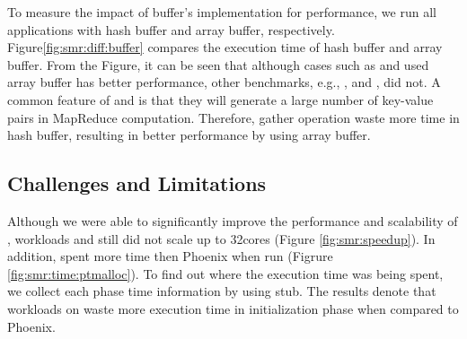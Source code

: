 
To measure the impact of buffer's implementation for performance, we run all applications with hash buffer and array buffer, respectively.
Figure\ref{fig:smr:diff:buffer} compares the execution time of hash buffer and array buffer. 
From the Figure, it can be seen that although cases such as  and  used array buffer has better performance, other benchmarks, e.g., ,  and , did not.
A common feature of  and  is that they will generate a large number of key-value pairs in MapReduce computation.
Therefore, gather operation waste more time in hash buffer, resulting in better performance by using array buffer.


\subsection{ Challenges and Limitations}	
Although we were able to significantly improve the performance and scalability of \myds, 
workloads  and  still did not scale up to 32cores (Figure \ref{fig:smr:speedup}).
In addition, \myds spent more time then Phoenix when run  (Figrure \ref{fig:smr:time:ptmalloc}). 
To find out where the execution time was being spent, we collect each phase time information by using stub. 
The results denote that workloads on \myds waste more execution time in initialization phase when compared to Phoenix.

